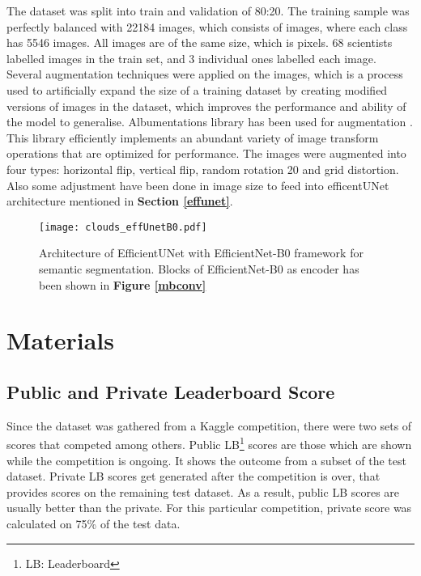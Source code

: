 \documentclass[conference]{IEEEtran}
\begin{document}
The dataset was split into train and validation of 80:20. The training sample was perfectly balanced with 22184 images, which consists of  images, where each class has 5546 images. All images are of the same size, which is  pixels. 68 scientists labelled images in the train set, and 3 individual ones labelled each image. Several augmentation techniques were applied on the images, which is a process used to artificially expand the size of a training dataset by creating modified versions of images in the dataset, which improves the performance and ability of the model to generalise. Albumentations library has been used for augmentation \cite{buslaev2020albumentations}. This library efficiently implements an abundant variety of image transform operations that are optimized for performance. The images were augmented into four types: horizontal flip, vertical flip, random rotation 20 and grid distortion. Also some adjustment have been done in image size to feed into efficentUNet architecture mentioned in \textbf{Section \ref{effunet}}. 








\begin{figure*}[ht!]
 \center
  \texttt{[image: clouds\_effUnetB0.pdf]}
  \caption{Architecture of EfficientUNet with EfficientNet-B0 framework for semantic segmentation. Blocks of EfficientNet-B0 as encoder has been shown in \textbf{Figure \ref{mbconv}}}
  \label{efficientunet}
\end{figure*}





\section{Materials}\label{evaluation}



\subsection{Public and Private Leaderboard Score}
Since the dataset was gathered from a Kaggle competition, there were two sets of scores that competed among others. Public LB\footnote{LB: Leaderboard} scores are those which are shown while the competition is ongoing. It shows the outcome from a subset of the test dataset. Private LB scores get generated after the competition is over, that provides scores on the remaining test dataset. As a result, public LB scores are usually better than the private. For this particular competition, private score was calculated on 75\% of the test data. 
\end{document}
